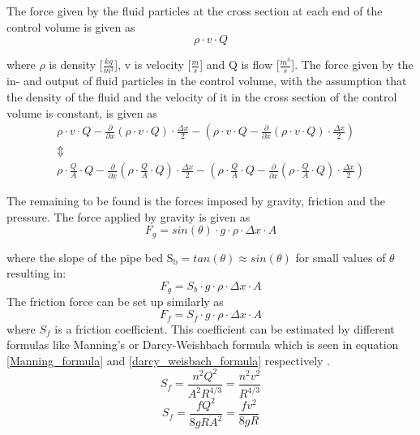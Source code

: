 The force given by the fluid particles at the cross section at each end of the control volume is given as
\begin{equation}
	\rho \cdot v \cdot Q
\end{equation}

where $\rho$ is density [$\frac{kg}{m^3}$], v is velocity [$\frac{m}{s}$] and Q is flow [$\frac{m^3}{s}$].
The force given by the in- and output of fluid particles in the control volume, with the assumption that the density of the fluid and the velocity of it in the cross section of the control volume is constant, is given as
\begin{equation}
\begin{array}{l}
\rho \cdot v \cdot Q - \frac{\partial}{\partial x}(\rho \cdot v \cdot Q) \cdot \frac{\Delta x}{2} - \left(\rho \cdot v \cdot Q - \frac{\partial}{\partial x}(\rho \cdot v \cdot Q) \cdot \frac{\Delta x}{2} \right) \\
\Updownarrow \\
\rho \cdot \frac{Q}{A} \cdot Q - \frac{\partial}{\partial x}(\rho \cdot \frac{Q}{A}  \cdot Q) \cdot \frac{\Delta x}{2} - \left(\rho \cdot \frac{Q}{A}  \cdot Q - \frac{\partial}{\partial x}(\rho \cdot \frac{Q}{A}  \cdot Q) \cdot \frac{\Delta x}{2} \right)
\end{array}
\label{mass_flow_speed}
\end{equation}

The remaining to be found is the forces imposed by gravity, friction and the pressure.
The force applied by gravity is given as
\begin{equation}
F_g = sin(\theta)\cdot g \cdot \rho \cdot \Delta x \cdot A
\label{gravity_force} 
\end{equation}

where the slope of the pipe bed $\text{S}_\text{b} = tan(\theta) \approx sin(\theta)$ for small values of $\theta$ resulting in:
\begin{equation}
F_g = S_b \cdot g \cdot \rho \cdot \Delta x \cdot A 
\end{equation}
The friction force can be set up similarly as
\begin{equation}
F_f = S_f \cdot g \cdot \rho \cdot \Delta x \cdot A 
\label{friction_force} 
\end{equation}
where $S_f$ is a friction coefficient. This coefficient can be estimated by different formulas like Manning's or Darcy-Weishbach formula which is seen in equation \ref{Manning_formula} and \ref{darcy_weisbach_formula} respectively . 
\begin{equation}
	S_f = \frac{n^2 Q^2}{A^2R^{4/3}}= \frac{n^2 v^2}{R^{4/3}}
\label{Manning_formula}
\end{equation}
\begin{equation}
	S_f = \frac{f Q^2}{8gR A^2}= \frac{f v^2}{8gR}
\label{darcy_weisbach_formula}
\end{equation}


